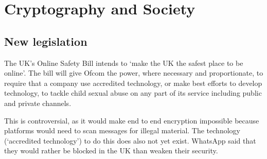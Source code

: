 \chapter{Cryptography and Society}

\section{New legislation}
The UK's Online Safety Bill intends to `make the UK the safest place to be online'. The bill will give Ofcom the power, where necessary and proportionate, to require that a company use accredited technology, or make best efforts to develop technology, to tackle child sexual abuse on any part of its service including public and private channels.

This is controversial, as it would make end to end encryption impossible because platforms would need to scan messages for illegal material. The technology (`accredited technology') to do this does also not yet exist. WhatsApp said that they would rather be blocked in the UK than weaken their security.
